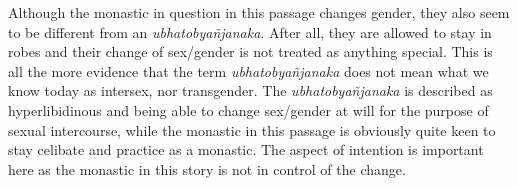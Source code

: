 Although the monastic in question in this passage changes gender, they also seem to be different from an {\em ubhatob­yañ­janaka}. After all, they are allowed to stay in robes and their change of sex/gender is not treated as anything special. This is all the more evidence that the term {\em ubhatob­yañ­janaka} does not mean what we know today as intersex, nor transgender. The {\em ubhatob­yañ­janaka} is described as hyperlibidinous and being able to change sex/gender at will for the purpose of sexual intercourse, while the monastic in this passage is obviously quite keen to stay celibate and practice as a monastic. The aspect of intention is important here as the monastic in this story is not in control of the change.